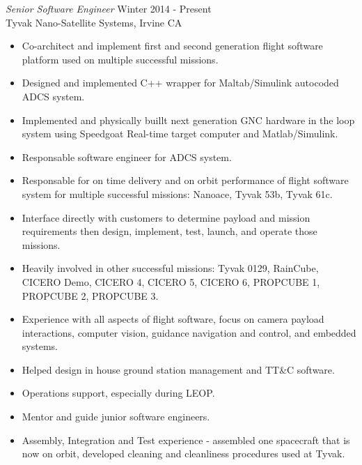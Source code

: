 \documentclass[line,margin]{res}
\begin{document}
\begin{resume}
				{\sl Senior Software Engineer} \hfill Winter 2014 - Present \\
				 Tyvak Nano-Satellite Systems, Irvine CA
				\begin{itemize}  \itemsep -2pt %
					\item Co-architect and implement first and second generation flight software platform used on multiple successful missions.
					\item Designed and implemented C++ wrapper for Maltab/Simulink autocoded ADCS system.
					\item Implemented and physically buillt next generation GNC hardware in the loop system using Speedgoat Real-time target computer and Matlab/Simulink.
					\item Responsable software engineer for ADCS system.
					\item Responsable for on time delivery and on orbit performance of flight software system for multiple successful missions: Nanoace, Tyvak 53b, Tyvak 61c.
					\item Interface directly with customers to determine payload and mission requirements then design, implement, test, launch, and operate those missions.
					\item Heavily involved in other successful missions: Tyvak 0129, RainCube, CICERO Demo, CICERO 4, CICERO 5, CICERO 6, PROPCUBE 1, PROPCUBE 2, PROPCUBE 3.
					\item Experience with all aspects of flight software, focus on camera payload interactions, computer vision, guidance navigation and control, and embedded systems.
					\item Helped design in house ground station management and TT\&C software.
					\item Operations support, especially during LEOP.
					\item Mentor and guide junior software engineers.
					\item Assembly, Integration and Test experience - assembled one spacecraft that is now on orbit, developed cleaning and cleanliness procedures used at Tyvak.
				\end{itemize}


\end{resume}
\end{document}
